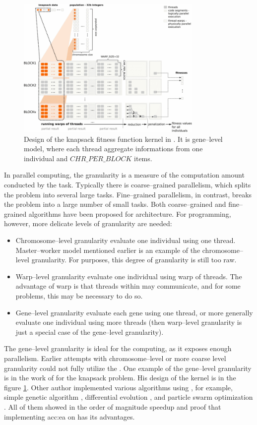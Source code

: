 \begin{figure}[hb!]
    \centering
    \includegraphics[width=0.8\textwidth]{img/KnapsackKernelDesign.png}
    \caption[Knapsack problem CUDA evaluation kernel]{Design of the knapsack fitness function kernel in \citet{GpuIsland}. It is gene--level model, where each thread aggregate informations from one individual and $CHR\_PER\_BLOCK$ items.}
    \label{fig:knapsackkernel}
\end{figure}

In parallel computing, the granularity is a measure of the computation amount conducted by the task. Typically there is coarse--grained parallelism, which splits the problem into several large tasks. Fine--grained parallelism, in contrast, breaks the problem into a large number of small tasks. Both coarse--grained and fine--grained algorithms have been proposed for \cpu architecture. For \gpu programming, however, more delicate levels of granularity are needed:
\begin{itemize}
    \item Chromosome--level granularity evaluate one individual using one thread. Master--worker model mentioned earlier is an example of the chromosome--level granularity. For \cuda purposes, this degree of granularity is still too raw.
    \item Warp--level granularity evaluate one individual using warp of threads. The advantage of warp is that threads within may communicate, and for some problems, this may be necessary to do so.
    \item Gene--level granularity evaluate each gene using one thread, or more generally evaluate one individual using more threads (then warp--level granularity is just a special case of the gene--level granularity).     
\end{itemize}
The gene--level granularity is ideal for the \gpu computing, as it exposes enough parallelism. Earlier attempts with chromosome--level or more coarse level granularity could not fully utilize the \gpuns. One example of the gene--level granularity is in the work of \citet*{GpuIsland} for the knapsack problem. His design of the \cuda kernel is in the figure \ref{fig:knapsackkernel}. Other author implemented various algorithms using \cudans, for example, simple genetic algorithm \citep{SimpleGACUDA}, differential evolution \citep{veronese2010differential}, and particle swarm optimization \citep{PSOCUDA}. All of them showed in the order of magnitude speedup and proof that implementing \acrlong{acc:ea} on \gpu has its advantages.
